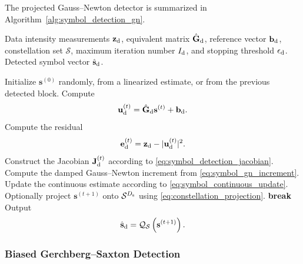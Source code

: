 \documentclass[journal]{IEEEtran}
\begin{document}
The projected Gauss--Newton detector is summarized in Algorithm~\ref{alg:symbol_detection_gn}.

\begin{algorithm}[t]
\caption{Projected Gauss--Newton Symbol Detection}
\label{alg:symbol_detection_gn}
\begin{algorithmic}[1]
\REQUIRE Data intensity measurements $\mathbf{z}_{\rm d}$, equivalent matrix $\hat{\mathbf{G}}_{\rm d}$, reference vector $\mathbf{b}_{\rm d}$, constellation set $\mathcal{S}$, maximum iteration number $I_{\rm d}$, and stopping threshold $\epsilon_{\rm d}$.
\ENSURE Detected symbol vector $\hat{\mathbf{s}}_{\rm d}$.

\STATE Initialize $\mathbf{s}^{(0)}$ randomly, from a linearized estimate, or from the previous detected block.
    \STATE Compute
    \[
    \mathbf{u}_{\rm d}^{(t)}
    =
    \hat{\mathbf{G}}_{\rm d}\mathbf{s}^{(t)}
    +
    \mathbf{b}_{\rm d}.
    \]
    \STATE Compute the residual
    \[
    \mathbf{e}_{\rm d}^{(t)}
    =
    \mathbf{z}_{\rm d}
    -
    |\mathbf{u}_{\rm d}^{(t)}|^2.
    \]
    \STATE Construct the Jacobian $\mathbf{J}_{\rm d}^{(t)}$ according to \eqref{eq:symbol_detection_jacobian}.
    \STATE Compute the damped Gauss--Newton increment from \eqref{eq:symbol_gn_increment}.
    \STATE Update the continuous estimate according to \eqref{eq:symbol_continuous_update}.
    \STATE Optionally project $\mathbf{s}^{(t+1)}$ onto $\mathcal{S}^{D_{\rm s}}$ using \eqref{eq:constellation_projection}.
        \STATE \textbf{break}
    \ENDIF
\ENDFOR
\STATE Output
\[
\hat{\mathbf{s}}_{\rm d}
=
\mathcal{Q}_{\mathcal{S}}
\left(
\mathbf{s}^{(t+1)}
\right).
\]
\end{algorithmic}
\end{algorithm}

\subsubsection{Biased Gerchberg--Saxton Detection}
\end{document}
